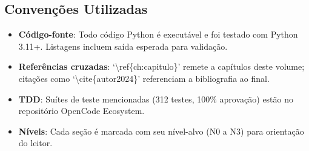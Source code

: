 
\subsection{Convenções Utilizadas}

\begin{itemize}
    \item \textbf{Código-fonte}: Todo código Python é executável e foi testado com Python 3.11+. Listagens incluem saída esperada para validação.
    \item \textbf{Referências cruzadas}: `\textbackslash ref\{ch:capitulo\}' remete a capítulos deste volume; citações como `\textbackslash cite\{autor2024\}' referenciam a bibliografia ao final.
    \item \textbf{TDD}: Suítes de teste mencionadas (312 testes, 100\% aprovação) estão no repositório OpenCode Ecosystem.
    \item \textbf{Níveis}: Cada seção é marcada com seu nível-alvo (N0 a N3) para orientação do leitor.
\end{itemize}
